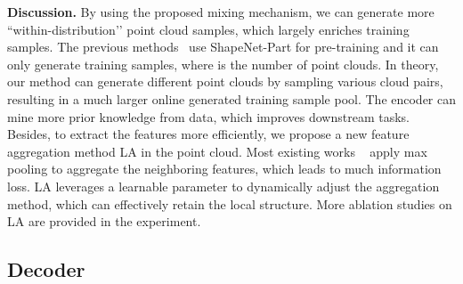 \documentclass[journal]{IEEEtran}
\begin{document}
\textbf{Discussion.} By using the proposed mixing mechanism, we can generate more ``within-distribution’’ point cloud samples, which largely enriches training samples. The previous methods~\cite{sauder2019self} use ShapeNet-Part for pre-training and it can only generate  training samples, where  is the number of point clouds. In theory, our method can generate  different point clouds by sampling various cloud pairs, resulting in a much larger online generated training sample pool. The encoder can mine more prior knowledge from data, which improves downstream tasks. Besides, to extract the features more efficiently, we propose a new feature aggregation method LA in the point cloud. Most existing works ~\cite{qi2017pointnet++, wang2019dynamic} apply max pooling to aggregate the neighboring features, which leads to much information loss. LA leverages a learnable parameter to dynamically adjust the aggregation method, which can effectively retain the local structure. More ablation studies on LA are provided in the experiment.


\subsection{Decoder}
\end{document}
